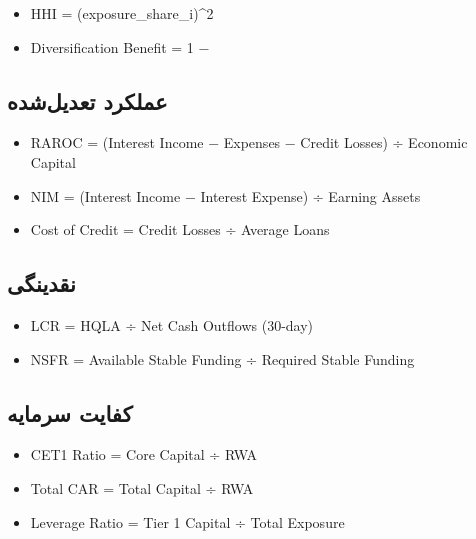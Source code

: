 \documentclass[12pt,a4paper]{article}
\begin{document}
\begin{latin}
\begin{itemize}
    \item HHI = \sum (exposure\_share_i)^2
    \item Diversification Benefit = 1 − 
\end{itemize}
\end{latin}

\subsection{عملکرد تعدیل‌شده}

\begin{latin}
\begin{itemize}
    \item RAROC = (Interest Income − Expenses − Credit Losses) ÷ Economic Capital
    \item NIM = (Interest Income − Interest Expense) ÷ Earning Assets
    \item Cost of Credit = Credit Losses ÷ Average Loans
\end{itemize}
\end{latin}

\subsection{نقدینگی}

\begin{latin}
\begin{itemize}
    \item LCR = HQLA ÷ Net Cash Outflows (30-day)
    \item NSFR = Available Stable Funding ÷ Required Stable Funding
\end{itemize}
\end{latin}

\subsection{کفایت سرمایه}

\begin{latin}
\begin{itemize}
    \item CET1 Ratio = Core Capital ÷ RWA
    \item Total CAR = Total Capital ÷ RWA
    \item Leverage Ratio = Tier 1 Capital ÷ Total Exposure
\end{itemize}
\end{latin}
\end{document}
